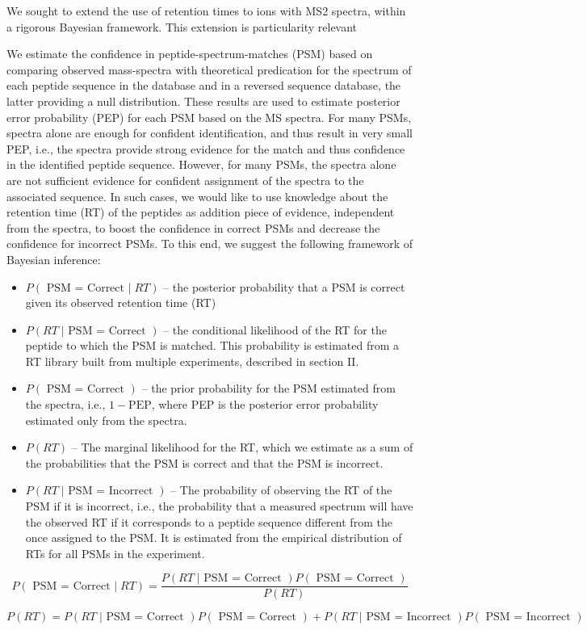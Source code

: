 We sought to extend the use of retention times to ions with MS2 spectra, within a rigorous Bayesian framework. This extension is particularity relevant    

We estimate the confidence in peptide-spectrum-matches (PSM) based on comparing observed mass-spectra with theoretical predication for the spectrum of each peptide sequence in the database and in a reversed sequence database, the latter providing a null distribution. These results are used to estimate posterior error probability (PEP) for each PSM based on the MS spectra. For many PSMs, spectra alone are enough for confident identification, and thus result in very small PEP, i.e., the spectra provide strong evidence for the match and thus confidence in the identified peptide sequence. However, for many PSMs, the spectra alone are not sufficient evidence for confident assignment of the spectra to the associated sequence. In such cases, we would like to use knowledge about the retention time (RT) of the peptides as addition piece of evidence, independent from the spectra, to boost the confidence in correct PSMs and decrease the confidence for incorrect PSMs. To this end, we suggest the following framework of Bayesian inference:

\begin{itemize}
\item $P(\mbox{ PSM = Correct }|\;RT)$ -- the posterior probability that a PSM is correct given its observed retention time (RT)
\item $P(RT\; | \mbox{ PSM = Correct })$ -- the conditional likelihood of the RT for the peptide to which the PSM is matched. This probability is estimated from a RT library built from multiple experiments, described in section II. 
\item $P(\mbox{ PSM = Correct })$ -- the prior probability for the PSM estimated from the spectra, i.e., $1- \mbox{PEP}$, where PEP is the posterior error probability estimated only from the spectra. 
\item $P(RT)$ -- The marginal likelihood for the RT, which we estimate as a sum of the probabilities that the PSM is correct and that the PSM is incorrect.
\item $P(RT\; | \mbox{ PSM = Incorrect })$ -- The probability of observing the RT of the PSM if it is incorrect, i.e., the probability that a measured spectrum will have the observed RT if it corresponds to a peptide  sequence different from the once assigned to the PSM. It is estimated from the empirical distribution of RTs for all PSMs in the experiment.      
\end{itemize}    

$$ P(\mbox{ PSM = Correct }|\;RT) =
	 \frac{ P(RT\; | \mbox{ PSM = Correct })P(\mbox{ PSM = Correct }) }
	 	  { P(RT) }
$$

$$
P(RT) = P(RT\; | \mbox{ PSM = Correct })P(\mbox{ PSM = Correct }) + 
	 	  	P(RT\; | \mbox{ PSM = Incorrect })P(\mbox{ PSM = Incorrect })
$$



